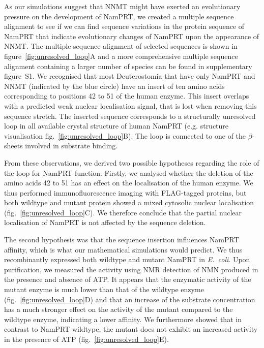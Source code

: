 As our simulations suggest that NNMT might have exerted an evolutionary pressure on the development of NamPRT, we created a multiple sequence alignment to see if we can find sequence variations in the protein sequence of NamPRT that indicate evolutionary changes of NamPRT upon the appearance of NNMT. The multiple sequence alignment of selected sequences is shown in figure~\ref{fig:unresolved_loop}A and a more comprehensive multiple sequence alignment containing a larger number of species can be found in supplementary figure~S1. We recognised that most Deuterostomia that have only NamPRT and NNMT (indicated by the blue circle) have an insert of ten amino acids corresponding to positions 42 to 51 of the human enzyme. This insert overlaps with a predicted weak nuclear localisation signal, that is lost when removing this sequence stretch. The inserted sequence corresponds to a structurally unresolved loop in all available crystal structure of human NamPRT (e.g. \cite{Wang2006} structure visualisation fig.~\ref{fig:unresolved_loop}B). The loop is connected to one of the $\beta$-sheets involved in substrate binding.

From these observations, we derived two possible hypotheses regarding the role of the loop for NamPRT function. Firstly, we analysed whether the deletion of the amino acids 42 to 51 has an effect on the localisation of the human enzyme. We thus performed immunofluorescence imaging with FLAG-tagged proteins, but both wildtype and mutant protein showed a mixed cytosolic nuclear localisation (fig.~\ref{fig:unresolved_loop}C). We therefore conclude that the partial nuclear localisation of NamPRT is not affected by the sequence deletion.

The second hypothesis was that the sequence insertion influences NamPRT affinity, which is what our mathematical simulations would predict. We thus recombinantly expressed both wildtype and mutant NamPRT in \textit{E.~coli}. Upon purification, we measured the activity using NMR detection of NMN produced in the presence and absence of ATP. It appears that the enzymatic activity of the mutant enzyme is much lower than that of the wildtype enzyme (fig.~\ref{fig:unresolved_loop}D) and that an increase of the substrate concentration has a much stronger effect on the activity of the mutant compared to the wildtype enzyme, indicating a lower affinity. We furthermore showed that in contrast to NamPRT wildtype, the mutant does not exhibit an increased activity in the presence of ATP (fig.~\ref{fig:unresolved_loop}E).


